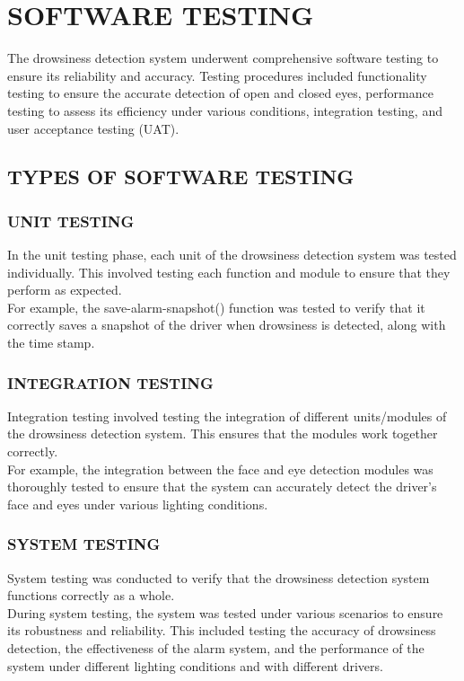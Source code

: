 \documentclass[12pt]{article}
\begin{document}
\newpage
\section{SOFTWARE TESTING }

The drowsiness detection system underwent comprehensive software testing to ensure its reliability and accuracy. Testing procedures included functionality testing to ensure the accurate detection of open and closed eyes, performance testing to assess its efficiency under various conditions, integration testing, and user acceptance testing (UAT).
\subsection{TYPES OF SOFTWARE TESTING}
\subsubsection{UNIT TESTING }
In the unit testing phase, each unit of the drowsiness detection system was tested individually. This involved testing each function and module to ensure that they perform as expected.\\

For example, the save-alarm-snapshot() function was tested to verify that it correctly saves a snapshot of the driver when drowsiness is detected, along with the time stamp.
\subsubsection{INTEGRATION TESTING}
Integration testing involved testing the integration of different units/modules of the drowsiness detection system. This ensures that the modules work together correctly.\\

For example, the integration between the face and eye detection modules was thoroughly tested to ensure that the system can accurately detect the driver's face and eyes under various lighting conditions.
\subsubsection{ SYSTEM TESTING}
System testing was conducted to verify that the drowsiness detection system functions correctly as a whole.\\

During system testing, the system was tested under various scenarios to ensure its robustness and reliability. This included testing the accuracy of drowsiness detection, the effectiveness of the alarm system, and the performance of the system under different lighting conditions and with different drivers.
\end{document}
